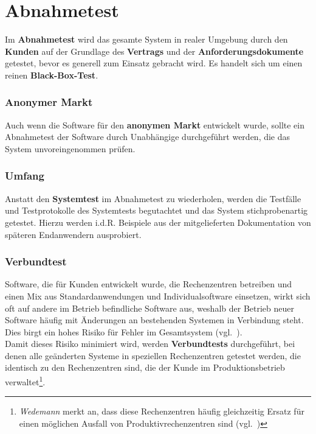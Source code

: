 \section{Abnahmetest}

\begin{tcolorbox}[title=Abnahmetest]
Im \textbf{Abnahmetest} wird das gesamte System in realer Umgebung durch den \textbf{Kunden} auf der Grundlage des \textbf{Vertrags} und der \textbf{Anforderungsdokumente} getestet, bevor es generell zum Einsatz gebracht wird. Es handelt sich um einen reinen \textbf{Black-Box-Test}.
\end{tcolorbox}

\subsubsection*{Anonymer Markt}
Auch wenn die Software für den \textbf{anonymen Markt} entwickelt wurde, sollte ein Abnahmetest der Software durch Unabhängige durchgeführt werden, die das System unvoreingenommen prüfen.

\subsubsection*{Umfang}
Anstatt den \textbf{Systemtest} im Abnahmetest zu wiederholen, werden die Testfälle und Testprotokolle des Systemtests begutachtet und das System stichprobenartig getestet.
Hierzu werden i.d.R. Beispiele aus der mitgelieferten Dokumentation von späteren Endanwendern ausprobiert.

\subsubsection*{Verbundtest}
Software, die für Kunden entwickelt wurde, die Rechenzentren betreiben und einen Mix aus Standardanwendungen und Individualsoftware einsetzen, wirkt sich oft auf andere im Betrieb befindliche Software aus, weshalb der Betrieb neuer Software häufig mit Änderungen an bestehenden Systemen in Verbindung steht.\\
Dies birgt ein hohes Risiko für Fehler im Gesamtsystem (vgl.~\cite[65]{Wed09c}).\\
Damit dieses Risiko minimiert wird, werden \textbf{Verbundtests} durchgeführt, bei denen alle geänderten Systeme in speziellen Rechenzentren getestet werden, die identisch zu den Rechenzentren sind, die der Kunde im Produktionsbetrieb verwaltet\footnote{
    \textit{Wedemann} merkt an, dass diese Rechenzentren häufig gleichzeitig Ersatz für einen möglichen Ausfall von Produktivrechenzentren sind (vgl.~\cite[65]{Wed09c})
}.

